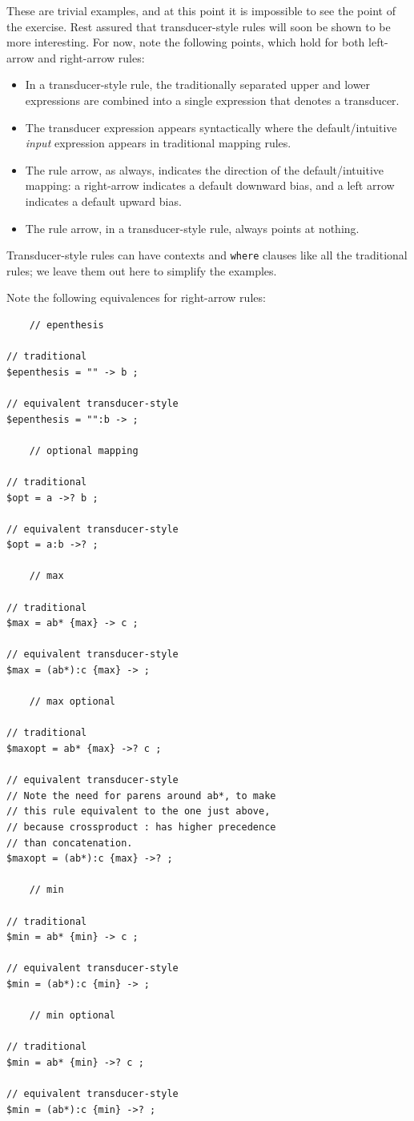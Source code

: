 These are trivial examples, and at this point it is impossible to see the point of the exercise.  Rest
assured that transducer-style rules will soon be shown to be more interesting.  For now, note the
following points, which hold for both left-arrow and right-arrow rules:

\begin{itemize}
	\item
In a transducer-style rule, the traditionally separated upper and lower expressions are combined into a single expression
that denotes a transducer.
\item
	The transducer expression appears syntactically where the default/intuitive \emph{input} expression appears in
	traditional mapping rules.
\item
	The rule arrow, as always, indicates the direction of the default/intuitive mapping:  a right-arrow
	indicates a default downward bias, and a left arrow indicates a default upward
	bias.
\item
The rule arrow, in a transducer-style rule, always points at nothing.
\end{itemize}

\noindent
Transducer-style rules can have contexts and \texttt{where} clauses like all the traditional rules; we
leave them out here to simplify the examples.

Note the following equivalences for right-arrow rules:

\begin{Verbatim}
	// epenthesis

// traditional
$epenthesis = "" -> b ;

// equivalent transducer-style
$epenthesis = "":b -> ;

	// optional mapping

// traditional
$opt = a ->? b ;

// equivalent transducer-style
$opt = a:b ->? ;

	// max 

// traditional
$max = ab* {max} -> c ;

// equivalent transducer-style
$max = (ab*):c {max} -> ;

	// max optional

// traditional
$maxopt = ab* {max} ->? c ;

// equivalent transducer-style
// Note the need for parens around ab*, to make
// this rule equivalent to the one just above,
// because crossproduct : has higher precedence
// than concatenation.
$maxopt = (ab*):c {max} ->? ;

	// min

// traditional
$min = ab* {min} -> c ;

// equivalent transducer-style
$min = (ab*):c {min} -> ; 

	// min optional

// traditional
$min = ab* {min} ->? c ;

// equivalent transducer-style
$min = (ab*):c {min} ->? ;
\end{Verbatim}

